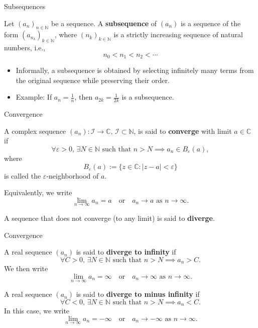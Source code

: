 \documentclass[dvipsnames]{beamer}
\theoremstyle{plain}
\theoremstyle{definition}
\begin{document}
\begin{frame}{Subsequences}

\begin{definition}
Let \((a_n)_{n \in \mathbb{N}}\) be a sequence. A \textbf{subsequence} of \((a_n)\) is a sequence of the form \((a_{n_k})_{k \in \mathbb{N}}\), where \((n_k)_{k \in \mathbb{N}}\) is a strictly increasing sequence of natural numbers, i.e.,
\[
n_0 < n_1 < n_2 < \cdots
\]
\end{definition}

\begin{itemize}
    \item Informally, a subsequence is obtained by selecting infinitely many terms from the original sequence while preserving their order.
    \item Example: If \(a_n = \frac{1}{n}\), then \(a_{2k} = \frac{1}{2k}\) is a subsequence.
\end{itemize}

\end{frame}

\begin{frame}{Convergence}
\begin{definition}
A complex sequence \((a_n) : \mathcal{I} \to \mathbb{C}, \, \mathcal{I} \subset \mathbb{N}\), is said to \textbf{converge} with limit \(a \in \mathbb{C}\) if  
\[
\forall \varepsilon > 0, \, \exists N \in \mathbb{N} \text{ such that } n > N \implies a_n \in B_\varepsilon(a),
\]
where 
\[
B_\varepsilon(a) := \{ z \in \mathbb{C} : |z - a| < \varepsilon \}
\] 
is called the \(\varepsilon\)-neighborhood of \(a\).

Equivalently, we write
\[
\lim_{n \to \infty} a_n = a \quad \text{or} \quad a_n \to a \text{ as } n \to \infty.
\]

A sequence that does not converge (to any limit) is said to \textbf{diverge}.
\end{definition}

\end{frame}

\begin{frame}{Convergence}
\begin{definition}
A real sequence \((a_n)\) is said to \textbf{diverge to infinity} if  
\[
\forall C > 0, \, \exists N \in \mathbb{N} \text{ such that } n > N \implies a_n > C.
\]  
We then write
\[
\lim_{n \to \infty} a_n = \infty \quad \text{or} \quad a_n \to \infty \text{ as } n \to \infty.
\]

A real sequence \((a_n)\) is said to \textbf{diverge to minus infinity} if  
\[
\forall C < 0, \, \exists N \in \mathbb{N} \text{ such that } n > N \implies a_n < C.
\]  
In this case, we write
\[
\lim_{n \to \infty} a_n = -\infty \quad \text{or} \quad a_n \to -\infty \text{ as } n \to \infty.
\]
\end{definition}
\end{frame}
\end{document}
